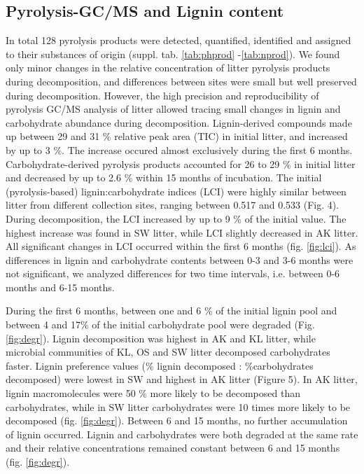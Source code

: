 \subsection*{Pyrolysis-GC/MS and Lignin content}
In total 128 pyrolysis products were detected, quantified, identified and assigned to their substances of origin (suppl. tab. \ref{tab:phprod} -\ref{tab:nprod}). We found only minor changes in the relative concentration of litter pyrolysis products during decomposition, and differences between sites were small but well preserved during decomposition. However, the high precision and reproducibility of pyrolysis GC/MS analysis of litter allowed tracing small changes in lignin and carbohydrate abundance during decomposition. Lignin-derived compounds made up between 29 and 31 \% relative peak area (TIC) in initial litter, and increased by up to 3 \%. The increase occured almost exclusively during the first 6 months. Carbohydrate-derived pyrolysis products accounted for 26 to 29 \% in initial litter and decreased by up to 2.6 \% within 15 months of incubation. The initial (pyrolysis-based) lignin:carbohydrate indices (LCI) were highly similar between litter from different collection sites, ranging between 0.517 and 0.533 (Fig. 4). During decomposition, the LCI increased by up to 9 \% of the initial value. The highest increase was found in SW litter, while LCI slightly decreased in AK litter. All significant changes in LCI  occurred within the first 6 months (fig. \ref{fig:lci}). As differences in lignin and carbohydrate contents between 0-3 and 3-6 months were not significant, we analyzed differences for two time intervals, i.e. between 0-6 months and 6-15 months.

During the first 6 months, between one and 6 \% of the initial lignin pool and between 4 and 17\% of the initial carbohydrate pool were degraded (Fig. \ref{fig:degr}). Lignin decomposition was highest in AK and KL litter, while microbial communities of KL, OS and SW litter decomposed carbohydrates faster. Lignin preference values (\% lignin decomposed : \%carbohydrates decomposed) were lowest in SW and highest in AK litter (Figure 5). In AK litter, lignin macromolecules were 50 \% more likely to be decomposed than carbohydrates, while in SW litter carbohydrates were 10 times more likely to be decomposed (fig. \ref{fig:degr}). Between 6 and 15 months, no further accumulation of lignin occurred. Lignin and carbohydrates were both degraded at the same rate and their relative concentrations remained constant between 6 and 15 months (fig. \ref{fig:degr}).

